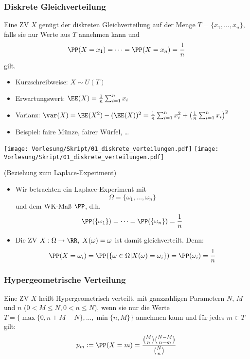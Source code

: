 \documentclass{scrreprt}
\begin{document}
\subsubsection{Diskrete Gleichverteilung}

 Eine ZV $X$ genügt der diskreten Gleichverteilung auf der Menge $T=\{x_1,\dots,x_n\}$, falls sie nur Werte aus $T$ annehmen kann und 
$$\PP(X=x_1) = \dots = \PP(X=x_n) = \frac{1}{n}$$
gilt.

\begin{itemize}
\item Kurzschreibweise: $X\sim U(T)$
\item Erwartungswert: $\EE(X)=\frac{1}{n}\sum_{i=1}^n x_i$
\item Varianz: $\var(X)=\EE(X^2)-(\EE(X))^2 = \frac{1}{n} \sum_{i=1}^n x_i^2+\left(\frac{1}{n}\sum_{i=1}^n x_i\right)^2$
\item Beispiel: faire Münze, fairer Würfel, …
\end{itemize}
\begin{center}
\texttt{[image: Vorlesung/Skript/01\_diskrete\_verteilungen.pdf]}
\texttt{[image: Vorlesung/Skript/01\_diskrete\_verteilungen.pdf]}
\end{center}

 (Beziehung zum Laplace-Experiment)
\begin{itemize}
\item Wir betrachten ein Laplace-Experiment mit 
$$\Omega = \{\omega_1, \dots, \omega_n\}$$ 
und dem WK-Maß $\PP$, d.h. 
$$\PP(\{\omega_1\})=\dots= \PP(\{\omega_n\})=\frac{1}{n}$$
\item Die ZV $X:\Omega \to \RR, \; X(\omega) = \omega$ ist damit gleichverteilt. Denn: 
$$\PP(X=\omega_i)=\PP(\{\omega\in \Omega | X(\omega) = \omega_i\})=\PP(\omega_i)=\frac{1}{n}$$
\end{itemize}

\subsubsection{Hypergeometrische Verteilung}
 Eine ZV $X$ heißt Hypergeometrisch verteilt, mit ganzzahligen Parametern $N$, $M$ und $n$ ($0<M\leq N, 0 < n \leq N$), wenn sie nur die Werte $T=\{\max\{0,n+M-N\}, \dots, \min\{n,M\}\}$ annehmen kann und für jedes $m \in T$ gilt:
$$p_m:=\PP(X=m)=\frac{\binom{M}{n}\binom{N-M}{n-m}}{\binom{N}{n}}$$
\end{document}
